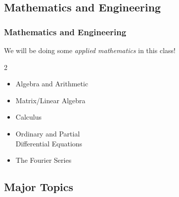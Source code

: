 \documentclass{ltx-talk} %
\newcommand{\sectionIsubsectionIIItitle}{Mathematics and Engineering}
\newcommand{\sectionIsubsectionIVtitle}{Major Topics}
\begin{document}
		\subsection{\sectionIsubsectionIIItitle}\label{sectionIsubsectionIII}
			\begin{frame} 
				\frametitle{\sectionIsubsectionIIItitle}

				We will be doing some {\it applied mathematics} in this class!
				\begin{multicols}{2}
				\begin{itemize}
					\item Algebra and Arithmetic\\
					\item Matrix\slash Linear Algebra \\
					\item Calculus \\
					\item Ordinary and Partial \\Differential Equations \\
					\item The Fourier Series \\
				\end{itemize}
				\end{multicols} 

				\btVFill
			\end{frame}	

		\subsection{\sectionIsubsectionIVtitle}\label{sectionIsubsectionIV}	
\end{document}
